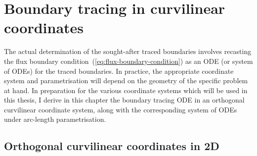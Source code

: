 \chapter{Boundary tracing in curvilinear coordinates}
\label{ch:curvilinear}

The actual determination of the sought-after traced boundaries involves
recasting the flux boundary condition~(\ref{eq:flux-boundary-condition})
as an ODE (or system of ODEs) for the traced boundaries.
In practice, the appropriate coordinate system and parametrisation
will depend on the geometry of the specific problem at hand.
In preparation for the various coordinate systems
which will be used in this thesis,
I derive in this chapter the boundary tracing ODE
in an orthogonal curvilinear coordinate system,
along with the corresponding system of ODEs
under arc-length parametrisation.

\section{Orthogonal curvilinear coordinates in 2D}
\label{sec:curvilinear.orthogonal}


